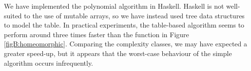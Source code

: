 We have implemented the polynomial algorithm in Haskell. Haskell is not well-suited to the use of mutable arrays, so we have instead used tree data structures to model the table. In practical experiments, the table-based algorithm seems to perform around three times faster than the function in Figure \ref{figB:homeomorphic}. Comparing the complexity classes, we may have expected a greater speed-up, but it appears that the worst-case behaviour of the simple algorithm occurs infrequently.
